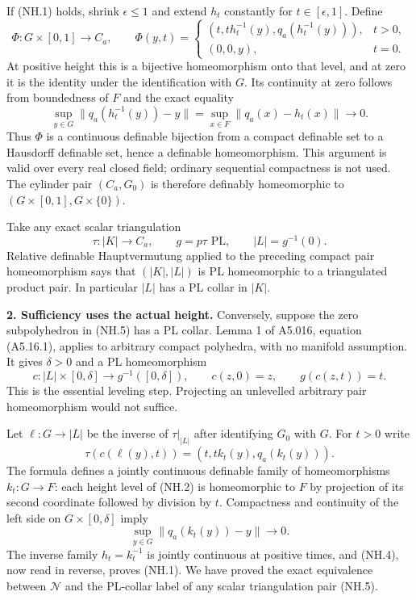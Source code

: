 If (NH.1) holds, shrink $\epsilon\leq1$ and extend $h_t$ constantly for
$t\in[\epsilon,1]$. Define
\[
 \Phi:G\times[0,1]\longrightarrow C_a,\qquad
 \Phi(y,t)=
 \begin{cases}
 (t,t h_t^{-1}(y),q_a(h_t^{-1}(y))),&t>0,\\
 (0,0,y),&t=0.
 \end{cases}                                                    \tag{NH.3}
\]
At positive height this is a bijective homeomorphism onto that level, and
at zero it is the identity under the identification with $G$. Its continuity
at zero follows from boundedness of $F$ and the exact equality
\[
 \sup_{y\in G}\|q_a(h_t^{-1}(y))-y\|
       =\sup_{x\in F}\|q_a(x)-h_t(x)\|\longrightarrow0.          \tag{NH.4}
\]
Thus $\Phi$ is a continuous definable bijection from a compact definable
set to a Hausdorff definable set, hence a definable homeomorphism. This
argument is valid over every real closed field; ordinary sequential
compactness is not used. The cylinder pair $(C_a,G_0)$ is therefore
definably homeomorphic to $(G\times[0,1],G\times\{0\})$.

Take any exact scalar triangulation
\[
 \tau:|K|\longrightarrow C_a,\qquad g=p\tau\text{ PL},\qquad
 |L|=g^{-1}(0).                                                   \tag{NH.5}
\]
Relative definable Hauptvermutung applied to the preceding compact pair
homeomorphism says that $(|K|,|L|)$ is PL homeomorphic to a triangulated
product pair. In particular $|L|$ has a PL collar in $|K|$.

\textbf{2. Sufficiency uses the actual height.}
Conversely, suppose the zero subpolyhedron in (NH.5) has a PL collar.
Lemma 1 of A5.016, equation (A5.16.1), applies to arbitrary compact
polyhedra, with no manifold assumption. It gives $\delta>0$ and a PL
homeomorphism
\[
 c:|L|\times[0,\delta]\longrightarrow g^{-1}([0,\delta]),
 \qquad c(z,0)=z,\qquad g(c(z,t))=t.                              \tag{NH.6}
\]
This is the essential leveling step. Projecting an unlevelled arbitrary
pair homeomorphism would not suffice.

Let $\ell:G\to|L|$ be the inverse of $\tau|_{|L|}$ after identifying
$G_0$ with $G$. For $t>0$ write
\[
 \tau(c(\ell(y),t))=(t,t k_t(y),q_a(k_t(y))).                    \tag{NH.7}
\]
The formula defines a jointly continuous definable family of homeomorphisms
$k_t:G\to F$: each height level of (NH.2) is homeomorphic to $F$ by
projection of its second coordinate followed by division by $t$.
Compactness and continuity of the left side on $G\times[0,\delta]$ imply
\[
 \sup_{y\in G}\|q_a(k_t(y))-y\|\longrightarrow0.                \tag{NH.8}
\]
The inverse family $h_t=k_t^{-1}$ is jointly continuous at positive times,
and (NH.4), now read in reverse, proves (NH.1). We have proved the exact
equivalence between $\mathcal N$ and the PL-collar label of any scalar
triangulation pair (NH.5).

